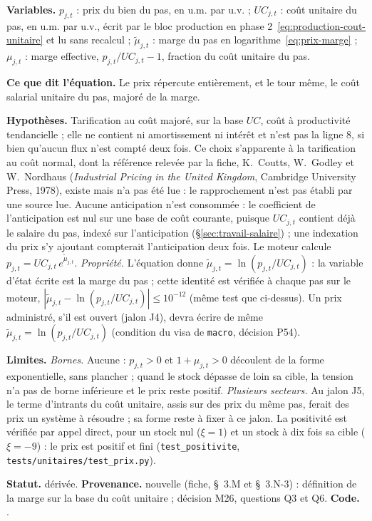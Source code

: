 \documentclass[11pt,a4paper]{article}
\newcommand{\variables}{\par\noindent\textbf{Variables.} }
\newcommand{\sens}{\par\noindent\textbf{Ce que dit l'équation.} }
\newcommand{\hyp}{\par\noindent\textbf{Hypothèses.} }
\newcommand{\limites}{\par\noindent\textbf{Limites.} }
\newcommand{\code}[1]{\texttt{\detokenize{#1}}}
\newcommand{\tracabilite}[3]{\par\smallskip\noindent\textbf{Statut.} #1. \textbf{Provenance.} #2. \textbf{Code.} \code{#3}.}
\begin{document}
\begin{lecture}
\variables $p_{j,t}$ : prix du bien du pas, en u.m. par u.v. ; $\mathit{UC}_{j,t}$ : coût unitaire du pas, en u.m. par u.v., écrit par le bloc production en phase 2~\eqref{eq:production-cout-unitaire} et lu sans recalcul ; $\tilde\mu_{j,t}$ : marge du pas en logarithme~\eqref{eq:prix-marge} ; $\mu_{j,t}$ : marge effective, $p_{j,t}/\mathit{UC}_{j,t} - 1$, fraction du coût unitaire du pas.
\sens Le prix répercute entièrement, et le tour même, le coût salarial unitaire du pas, majoré de la marge.
\hyp Tarification au coût majoré, sur la base $\mathit{UC}$, coût à productivité tendancielle ; elle ne contient ni amortissement ni intérêt et n'est pas la ligne 8, si bien qu'aucun flux n'est compté deux fois. Ce choix s'apparente à la tarification au coût normal, dont la référence relevée par la fiche, K.~Coutts, W.~Godley et W.~Nordhaus (\emph{Industrial Pricing in the United Kingdom}, Cambridge University Press, 1978), existe mais n'a pas été lue : le rapprochement n'est pas établi par une source lue. Aucune anticipation n'est consommée : le coefficient de l'anticipation est nul sur une base de coût courante, puisque $\mathit{UC}_{j,t}$ contient déjà le salaire du pas, indexé sur l'anticipation (\S\ref{sec:travail-salaire}) ; une indexation du prix s'y ajoutant compterait l'anticipation deux fois. Le moteur calcule $p_{j,t} = \mathit{UC}_{j,t}\, e^{\tilde\mu_{j,t}}$. \emph{Propriété.} L'équation donne $\tilde\mu_{j,t} = \ln(p_{j,t}/\mathit{UC}_{j,t})$ : la variable d'état écrite est la marge du pas ; cette identité est vérifiée à chaque pas sur le moteur, $|\tilde\mu_{j,t} - \ln(p_{j,t}/\mathit{UC}_{j,t})| \le 10^{-12}$ (même test que ci-dessus). Un prix administré, s'il est ouvert (jalon J4), devra écrire de même $\tilde\mu_{j,t} = \ln(p_{j,t}/\mathit{UC}_{j,t})$ (condition du visa de \texttt{macro}, décision P54).
\limites \emph{Bornes.} Aucune : $p_{j,t} > 0$ et $1 + \mu_{j,t} > 0$ découlent de la forme exponentielle, sans plancher ; quand le stock dépasse de loin sa cible, la tension n'a pas de borne inférieure et le prix reste positif. \emph{Plusieurs secteurs.} Au jalon J5, le terme d'intrants du coût unitaire, assis sur des prix du même pas, ferait des prix un système à résoudre ; sa forme reste à fixer à ce jalon. La positivité est vérifiée par appel direct, pour un stock nul ($\xi = 1$) et un stock à dix fois sa cible ($\xi = -9$) : le prix est positif et fini (\nolinkurl{test_positivite}, \nolinkurl{tests/unitaires/test_prix.py}).
\tracabilite{dérivée}{nouvelle (fiche, \S~3.M et \S~3.N-3) : définition de la marge sur la base du coût unitaire ; décision M26, questions Q3 et Q6}{nations.blocs.prix.prix_du_pas}
\end{lecture}
\end{document}
